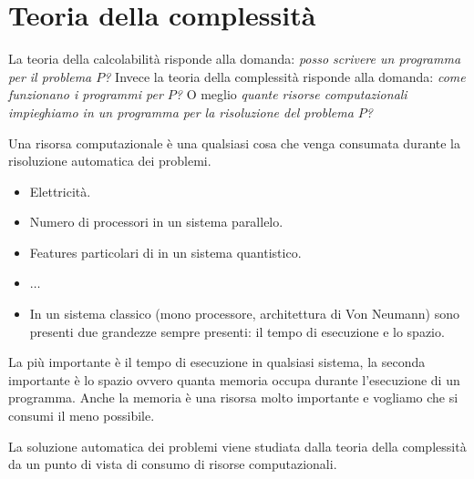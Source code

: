 \documentclass{article}
\begin{document}
\section{Teoria della complessità}
La teoria della calcolabilità risponde alla domanda: \textit{posso
    scrivere un programma per il problema $P$?}
Invece la teoria della complessità risponde alla domanda: \textit{come
    funzionano i programmi per $P$?}
O meglio \textit{quante risorse computazionali impieghiamo
    in un programma per la risoluzione
    del problema $P$?}

Una risorsa computazionale è una qualsiasi cosa che venga consumata
durante la risoluzione automatica dei problemi.
\begin{itemize}
    \item Elettricità.
    \item Numero di processori in un sistema parallelo.
    \item Features particolari di in un sistema quantistico.
    \item $\dots$
    \item In un sistema classico (mono processore, architettura di Von Neumann) sono presenti due
          grandezze sempre presenti: il tempo di esecuzione e lo spazio.
\end{itemize}
La più importante è il tempo di esecuzione in qualsiasi sistema, la seconda
importante è lo spazio ovvero quanta memoria occupa durante l'esecuzione di un programma.
Anche la memoria è una risorsa molto importante e vogliamo che si consumi il meno possibile.

La soluzione automatica dei problemi viene studiata dalla teoria della complessità
da un punto di vista di consumo di risorse computazionali.
\end{document}
